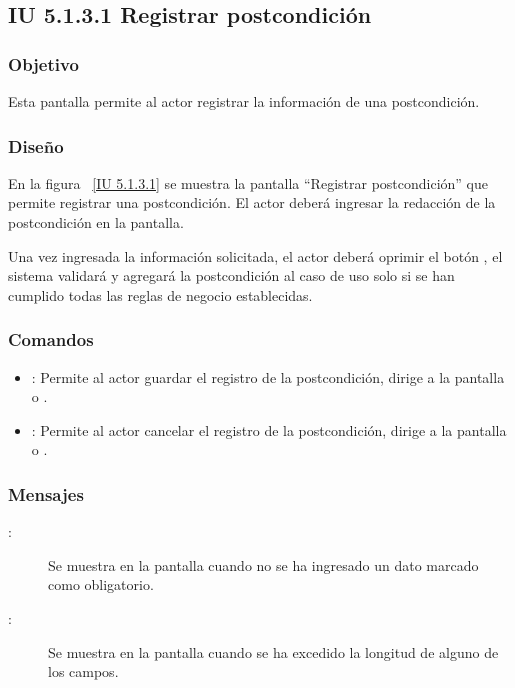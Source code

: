 \newpage 
\subsection{IU 5.1.3.1 Registrar postcondición}

\subsubsection{Objetivo}
	
	Esta pantalla permite al actor registrar la información de una postcondición.

\subsubsection{Diseño}

    En la figura ~\ref{IU 5.1.3.1} se muestra la pantalla ``Registrar postcondición'' que permite registrar una postcondición. El actor deberá ingresar la redacción de la postcondición en la pantalla.
    
    Una vez ingresada la información solicitada, el actor deberá oprimir el botón , el sistema validará y agregará la postcondición al caso de uso
    solo si se han cumplido todas las reglas de negocio establecidas.  \\
    




\subsubsection{Comandos}
\begin{itemize}
	\item {}: Permite al actor guardar el registro de la postcondición, dirige a la pantalla  o .
	\item {}: Permite al actor cancelar el registro de la postcondición, dirige a la pantalla  o .
\end{itemize}

\subsubsection{Mensajes}

	
\begin{description}
	\item[ :] Se muestra en la pantalla  cuando no se ha ingresado un dato marcado como obligatorio.
	\item[ :] Se muestra en la pantalla  cuando se ha excedido la longitud de alguno de los campos.
\end{description}
